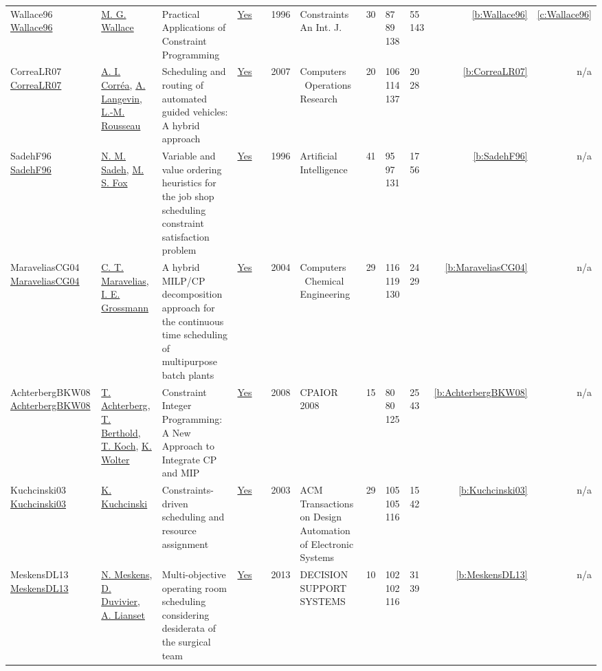 {\begin{longtable}{>{\raggedright\arraybackslash}p{3cm}>{\raggedright\arraybackslash}p{4.5cm}>{\raggedright\arraybackslash}p{6.0cm}rrrp{2.5cm}rp{1cm}p{1cm}rr}
Wallace96 \href{https://doi.org/10.1007/BF00143881}{Wallace96} & \hyperref[auth:a117]{M. G. Wallace} & Practical Applications of Constraint Programming & \href{../works/Wallace96.pdf}{Yes} & \cite{Wallace96} & 1996 & Constraints An Int. J. & 30 & 87 89 138 & 55 143 & \ref{b:Wallace96} & \ref{c:Wallace96}\\
CorreaLR07 \href{http://dx.doi.org/10.1016/j.cor.2005.07.004}{CorreaLR07} & \hyperref[auth:a949]{A. I. Corr{\'{e}}a}, \hyperref[auth:a645]{A. Langevin}, \hyperref[auth:a326]{L.-M. Rousseau} & Scheduling and routing of automated guided vehicles: A hybrid approach & \href{../works/CorreaLR07.pdf}{Yes} & \cite{CorreaLR07} & 2007 & Computers \  Operations Research & 20 & 106 114 137 & 20 28 & \ref{b:CorreaLR07} & n/a\\
SadehF96 \href{http://dx.doi.org/10.1016/0004-3702(95)00098-4}{SadehF96} & \hyperref[auth:a1044]{N. M. Sadeh}, \hyperref[auth:a302]{M. S. Fox} & \cellcolor{gold!20}Variable and value ordering heuristics for the job shop scheduling constraint satisfaction problem & \href{../works/SadehF96.pdf}{Yes} & \cite{SadehF96} & 1996 & Artificial Intelligence & 41 & 95 97 131 & 17 56 & \ref{b:SadehF96} & n/a\\
MaraveliasCG04 \href{http://dx.doi.org/10.1016/j.compchemeng.2004.03.016}{MaraveliasCG04} & \hyperref[auth:a381]{C. T. Maravelias}, \hyperref[auth:a382]{I. E. Grossmann} & A hybrid MILP/CP decomposition approach for the continuous time scheduling of multipurpose batch plants & \href{../works/MaraveliasCG04.pdf}{Yes} & \cite{MaraveliasCG04} & 2004 & Computers \  Chemical Engineering & 29 & 116 119 130 & 24 29 & \ref{b:MaraveliasCG04} & n/a\\
AchterbergBKW08 \href{https://doi.org/10.1007/978-3-540-68155-7_4}{AchterbergBKW08} & \hyperref[auth:a1045]{T. Achterberg}, \hyperref[auth:a351]{T. Berthold}, \hyperref[auth:a1168]{T. Koch}, \hyperref[auth:a1169]{K. Wolter} & Constraint Integer Programming: {A} New Approach to Integrate {CP} and {MIP} & \href{../works/AchterbergBKW08.pdf}{Yes} & \cite{AchterbergBKW08} & 2008 & CPAIOR 2008 & 15 & 80 80 125 & 25 43 & \ref{b:AchterbergBKW08} & n/a\\
Kuchcinski03 \href{http://dx.doi.org/10.1145/785411.785416}{Kuchcinski03} & \hyperref[auth:a660]{K. Kuchcinski} & Constraints-driven scheduling and resource assignment & \href{../works/Kuchcinski03.pdf}{Yes} & \cite{Kuchcinski03} & 2003 & ACM Transactions on Design Automation of Electronic Systems & 29 & 105 105 116 & 15 42 & \ref{b:Kuchcinski03} & n/a\\
MeskensDL13 \href{http://dx.doi.org/10.1016/j.dss.2012.10.019}{MeskensDL13} & \hyperref[auth:a597]{N. Meskens}, \hyperref[auth:a598]{D. Duvivier}, \hyperref[auth:a1461]{A. Lianset} & Multi-objective operating room scheduling considering desiderata of the surgical team & \href{../works/MeskensDL13.pdf}{Yes} & \cite{MeskensDL13} & 2013 & DECISION SUPPORT SYSTEMS & 10 & 102 102 116 & 31 39 & \ref{b:MeskensDL13} & n/a\\
\end{longtable}
}

